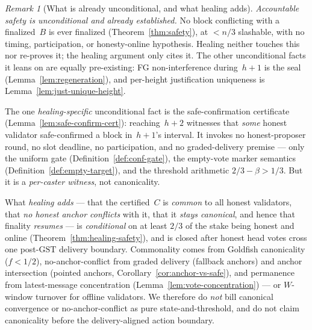 \ifx\litemode\undefined\documentclass{article}\fi
\newcommand{\GST}{\ensuremath{\mathrm{GST}}\xspace}
\newcommand{\Wvote}{\ensuremath{W}}         %
\theoremstyle{plain}
\theoremstyle{definition}
\theoremstyle{remark}
\newtheorem{remark}[theorem]{Remark}
\begin{document}
\begin{remark}[What is already unconditional, and what healing adds]\label{rem:safety-unconditional}
\emph{Accountable safety is unconditional and already established.}  No block
conflicting with a finalized~\(B\) is ever finalized (Theorem~\ref{thm:safety}), at
\(<n/3\) slashable, with no timing, participation, or honesty-online hypothesis.
Healing neither touches this nor re-proves it; the healing argument only cites it.
The other unconditional facts it leans on are equally pre-existing: FG
non-interference during~\(h+1\) is the seal (Lemma~\ref{lem:regeneration}), and
per-height justification uniqueness is Lemma~\ref{lem:just-unique-height}.

The one \emph{healing-specific} unconditional fact is the safe-confirmation
certificate (Lemma~\ref{lem:safe-confirm-cert}): reaching~\(h+2\) witnesses that
\emph{some} honest validator safe-confirmed a block in~\(h+1\)'s interval.  It
invokes no honest-proposer round, no slot deadline, no participation, and no
graded-delivery premise --- only the uniform gate (Definition~\ref{def:conf-gate}), the empty-vote
marker semantics (Definition~\ref{def:empty-target}), and the threshold arithmetic
\(2/3-\beta>1/3\).  But it is a \emph{per-caster witness}, not canonicality.

What \emph{healing adds} --- that the certified~\(C\) is \emph{common} to all
honest validators, that \emph{no honest anchor conflicts} with it, that it
\emph{stays canonical}, and hence that finality \emph{resumes} --- is
\emph{conditional} on at least \(2/3\) of the stake being honest and online
(Theorem~\ref{thm:healing-safety}), and is closed after honest head votes cross
one post-\GST{} delivery boundary.  Commonality comes from Goldfish canonicality
(\(f<1/2\)), no-anchor-conflict from graded delivery (fallback anchors) and anchor
intersection (pointed anchors, Corollary~\ref{cor:anchor-vs-safe}), and permanence
from latest-message concentration (Lemma~\ref{lem:vote-concentration}) --- or
\(\Wvote\)-window turnover for offline validators.  We therefore do \emph{not} bill
canonical convergence or no-anchor-conflict as pure state-and-threshold, and do not
claim canonicality before the delivery-aligned action boundary.
\end{remark}
\end{document}
